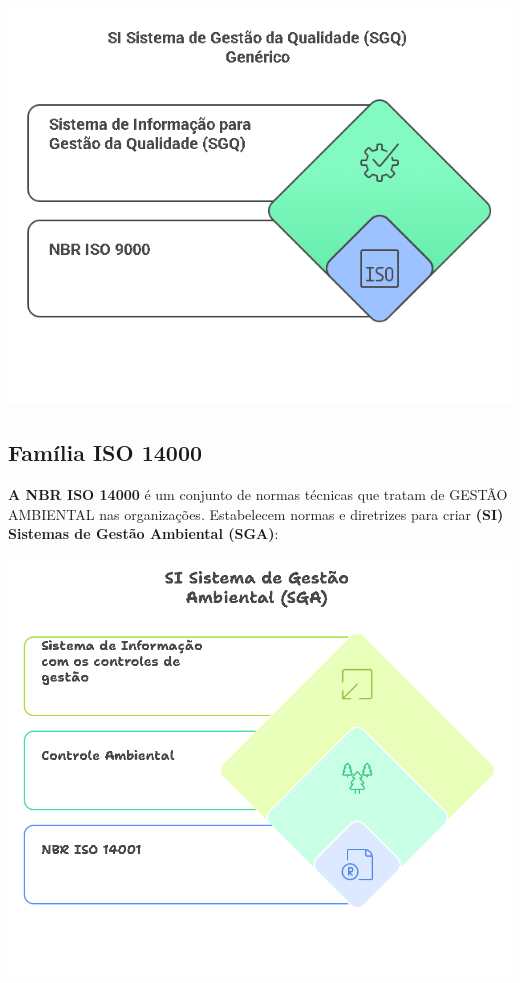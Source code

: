 \documentclass[
]{book}
\begin{document}
\includegraphics[width=5.71875in,height=\textheight]{images/qualidade-geral/ISO-9000-SGQ.png}

\subsection{Família ISO 14000}\label{famuxedlia-iso-14000}

\textbf{A NBR ISO 14000} é um conjunto de normas técnicas que tratam de GESTÃO AMBIENTAL nas organizações. Estabelecem normas e diretrizes para criar \textbf{(SI) Sistemas de Gestão Ambiental (SGA)}:

\includegraphics{images/qualidade-geral/ISO-14000-SGQ.png}
\end{document}
